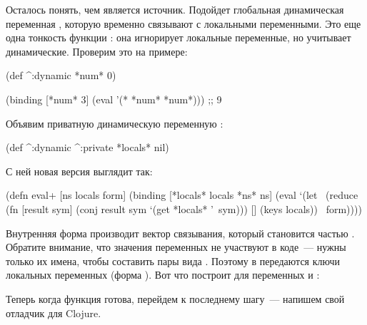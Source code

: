 Осталось понять, чем является источник. Подойдет глобальная динамическая переменная , которую временно связывают с локальными переменными. Это еще одна тонкость функции : она игнорирует локальные переменные, но учитывает динамические. Проверим это на примере:

\begin{english}
  \begin{clojure}
(def ^:dynamic *num* 0)

(binding [*num* 3]
  (eval '(* *num* *num*)))
;; 9
  \end{clojure}
\end{english}

Объявим приватную динамическую переменную :

\begin{english}
  \begin{clojure}
(def ^:dynamic ^:private
  *locals* nil)
  \end{clojure}
\end{english}

С ней новая версия  выглядит так:

\begin{english}
  \begin{clojure}
(defn eval+ [ns locals form]
  (binding [*locals* locals
            *ns* ns]
    (eval
     `(let ~(reduce
             (fn [result sym]
               (conj result sym `(get *locals* '~sym)))
             []
             (keys locals))
        ~form))))
  \end{clojure}
\end{english}

Внутренняя форма  производит вектор связывания, который становится частью . Обратите внимание, что значения переменных не участвуют в коде~--- нужны только их имена, чтобы составить пары вида . Поэтому в  передаются ключи локальных переменных (форма ). Вот что построит  для переменных  и :

\begin{english}
  \begin{clojure}
  \end{clojure}
\end{english}

Теперь когда функция  готова, перейдем к последнему шагу~--- напишем свой отладчик для Clojure.

